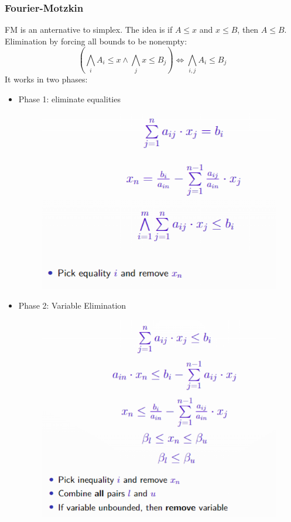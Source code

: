 \documentclass[10pt,a4paper]{report}
\begin{document}
\subsubsection{Fourier-Motzkin}
FM is an anternative to simplex. The idea is if $A \leq x$ and $x \leq B$, then $A \leq B$. Elimination by forcing all bounds to be nonempty:
$$
\left(\bigwedge_i A_i \leq x \land \bigwedge_j x\leq B_j \right) \Leftrightarrow \bigwedge_{i,j} A_i \leq B_j
$$
It works in two phases:
\begin{itemize}
    \item Phase 1: eliminate equalities
    \begin{figure}[H]
        \centering
        \includegraphics[scale=0.5]{37.png}
    \end{figure}
    \item Phase 2: Variable Elimination
    \begin{figure}[H]
        \centering
        \includegraphics[scale=0.5]{38.png}
    \end{figure}
\end{itemize}
\end{document}
